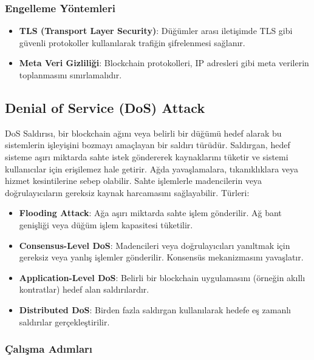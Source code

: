 \subsubsection{Engelleme Yöntemleri}

\begin{itemize}
    \item \textbf{TLS (Transport Layer Security)}: Düğümler arası iletişimde TLS gibi güvenli protokoller kullanılarak trafiğin şifrelenmesi sağlanır.
    \item \textbf{Meta Veri Gizliliği}: Blockchain protokolleri, IP adresleri gibi meta verilerin toplanmasını sınırlamalıdır.
\end{itemize}

\newpage

\subsection{Denial of Service (DoS) Attack}

DoS Saldırısı, bir blockchain ağını veya belirli bir düğümü hedef alarak bu sistemlerin işleyişini bozmayı amaçlayan bir saldırı türüdür. Saldırgan, hedef sisteme aşırı miktarda sahte istek göndererek kaynaklarını tüketir ve sistemi kullanıcılar için erişilemez hale getirir. Ağda yavaşlamalara, tıkanıklıklara veya hizmet kesintilerine sebep olabilir. Sahte işlemlerle madencilerin veya doğrulayıcıların gereksiz kaynak harcamasını sağlayabilir. Türleri:

\begin{itemize}
    \item \textbf{Flooding Attack}: Ağa aşırı miktarda sahte işlem gönderilir. Ağ bant genişliği veya düğüm işlem kapasitesi tüketilir.
    \item \textbf{Consensus-Level DoS}: Madencileri veya doğrulayıcıları yanıltmak için gereksiz veya yanlış işlemler gönderilir. Konsensüs mekanizmasını yavaşlatır.
    \item \textbf{Application-Level DoS}: Belirli bir blockchain uygulamasını (örneğin akıllı kontratlar) hedef alan saldırılardır.
    \item \textbf{Distributed DoS}: Birden fazla saldırgan kullanılarak hedefe eş zamanlı saldırılar gerçekleştirilir.
\end{itemize}

\subsubsection{Çalışma Adımları}

